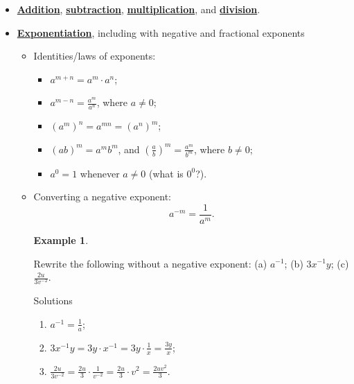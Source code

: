 \documentclass[
]{book}
\providecommand{\tightlist}{%
  \setlength{\itemsep}{0pt}\setlength{\parskip}{0pt}}
\theoremstyle{definition}
\theoremstyle{definition}
\newtheorem{example}{Example}[chapter]
\theoremstyle{definition}
\theoremstyle{definition}
\theoremstyle{remark}
\begin{document}
\begin{itemize}
\item
  \textbf{\href{https://en.wikipedia.org/wiki/Addition}{Addition}}, \textbf{\href{https://en.wikipedia.org/wiki/Subtraction}{subtraction}}, \textbf{\href{https://en.wikipedia.org/wiki/Multiplication}{multiplication}}, and \textbf{\href{https://en.wikipedia.org/wiki/Division_(mathematics)}{division}}.
\item
  \textbf{\href{https://en.wikipedia.org/wiki/Exponentiation}{Exponentiation}}, including with negative and fractional exponents

  \begin{itemize}
  \item
    Identities/laws of exponents:

    \begin{itemize}
    \tightlist
    \item
      \(a^{m+n} = a^m \cdot a^n\);
    \item
      \(a^{m-n} = \displaystyle\frac{a^m}{a^n}\), where \(a \ne 0\);
    \item
      \(\left(a^m\right)^n = a^{mn} = \left(a^n\right)^m\);
    \item
      \((ab)^m = a^mb^m\), and \(\displaystyle\left(\frac{a}{b}\right)^m = \frac{a^m}{b^m}\), where \(b \ne 0\);
    \item
      \(a^0 = 1\) whenever \(a \ne 0\) (what is \(0^0\)?).
    \end{itemize}
  \item
    Converting a negative exponent:
    \[a^{-m} = \frac{1}{a^m} .\]

    \begin{example}
    \protect\hypertarget{exm:neg-exp}{}\label{exm:neg-exp}

    Rewrite the following without a negative exponent: (a) \(a^{-1}\); (b) \(3x^{-1}y\); (c) \(\displaystyle \frac{2u}{3v^{-2}}\).

    Solutions

    \begin{enumerate}
    \def\labelenumi{(\alph{enumi})}
    \tightlist
    \item
      \(\displaystyle a^{-1} = \frac{1}{a}\);
    \item
      \(\displaystyle 3x^{-1}y = 3y \cdot x^{-1} = 3y \cdot \frac{1}{x} = \frac{3y}{x}\);
    \item
      \(\displaystyle \frac{2u}{3v^{-2}} = \frac{2u}{3} \cdot \frac{1}{v^{-2}} = \frac{2u}{3} \cdot v^2 = \frac{2uv^2}{3}\).
    \end{enumerate}


\end{example}
\end{itemize}
\end{itemize}
\end{document}
